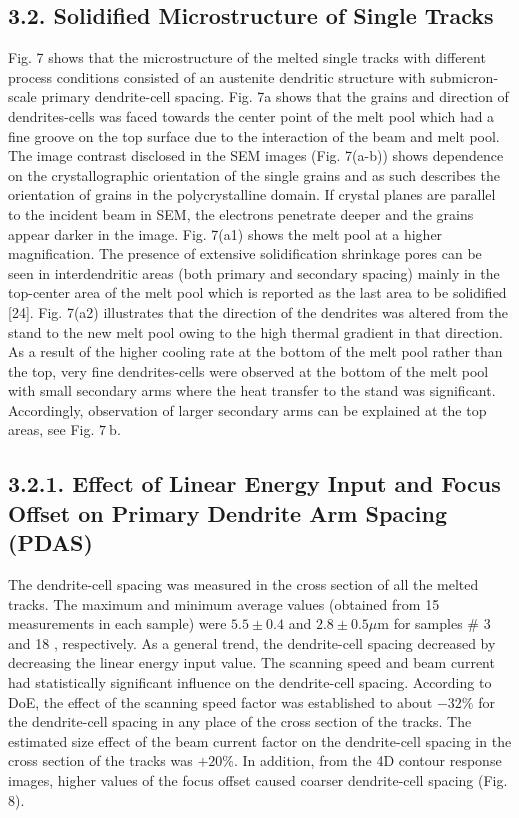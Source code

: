 \documentclass[10pt]{article}
\begin{document}
\subsection*{3.2. Solidified Microstructure of Single Tracks}
Fig. 7 shows that the microstructure of the melted single tracks with different process conditions consisted of an austenite dendritic structure with submicron-scale primary dendrite-cell spacing. Fig. 7a shows that the grains and direction of dendrites-cells was faced towards the center point of the melt pool which had a fine groove on the top surface due to the interaction of the beam and melt pool. The image contrast disclosed in the SEM images (Fig. 7(a-b)) shows dependence on the crystallographic orientation of the single grains and as such describes the orientation of grains in the polycrystalline domain. If crystal planes are parallel to the incident beam in SEM, the electrons penetrate deeper and the grains appear darker in the image. Fig. 7(a1) shows the melt pool at a higher magnification. The presence of extensive solidification shrinkage pores can be seen in interdendritic areas (both primary and secondary spacing) mainly in the top-center area of the melt pool which is reported as the last area to be solidified [24]. Fig. 7(a2) illustrates that the direction of the dendrites was altered from the stand to the new melt pool owing to the high thermal gradient in that direction. As a result of the higher cooling rate at the bottom of the melt pool rather than the top, very fine dendrites-cells were observed at the bottom of the melt pool with small secondary arms where the heat transfer to the stand was significant. Accordingly, observation of larger secondary arms can be explained at the top areas, see Fig. $7 \mathrm{~b}$.

\subsection*{3.2.1. Effect of Linear Energy Input and Focus Offset on Primary Dendrite Arm Spacing (PDAS)}
The dendrite-cell spacing was measured in the cross section of all the melted tracks. The maximum and minimum average values (obtained from 15 measurements in each sample) were $5.5 \pm 0.4$ and $2.8 \pm 0.5 \mu \mathrm{m}$ for samples \# 3 and 18 , respectively. As a general trend, the dendrite-cell spacing decreased by decreasing the linear energy input value. The scanning speed and beam current had statistically significant influence on the dendrite-cell spacing. According to DoE, the effect of the scanning speed factor was established to about $-32 \%$ for the dendrite-cell spacing in any place of the cross section of the tracks. The estimated size effect of the beam current factor on the dendrite-cell spacing in the cross section of the tracks was $+20 \%$. In addition, from the 4D contour response images, higher values of the focus offset caused coarser dendrite-cell spacing (Fig. 8).
\end{document}
